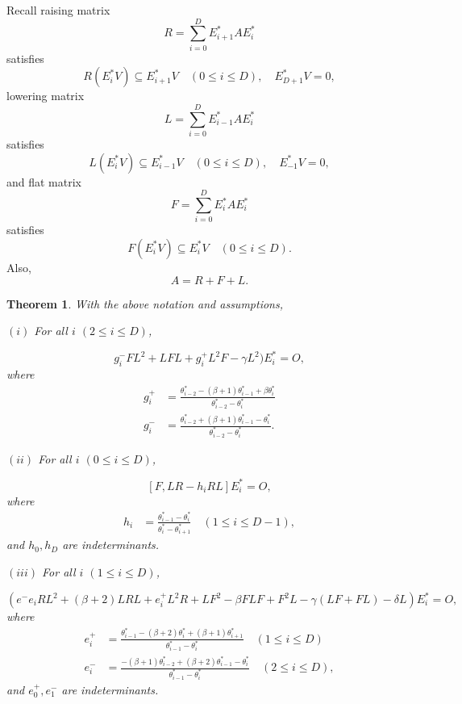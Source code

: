 \documentclass[
]{book}
\newtheorem{theorem}{Theorem}[chapter]
\theoremstyle{definition}
\theoremstyle{definition}
\theoremstyle{definition}
\theoremstyle{definition}
\theoremstyle{remark}
\begin{document}
Recall raising matrix
\[R = \sum_{i=0}^D E^*_{i+1}AE^*_i\]
satisfies
\[R(E^*_iV) \subseteq E^*_{i+1}V \quad (0\leq i\leq D), \quad E^*_{D+1}V = 0,\]
lowering matrix
\[L = \sum_{i=0}^D E^*_{i-1}AE^*_i\]
satisfies
\[L(E^*_iV) \subseteq E^*_{i-1}V \quad (0\leq i\leq D), \quad E^*_{-1}V = 0,\]
and flat matrix
\[F = \sum_{i=0}^D E^*_{i}AE^*_i\]
satisfies
\[F(E^*_iV) \subseteq E^*_{i}V \quad (0\leq i\leq D).\]
Also,
\[A = R + F + L.\]

\begin{theorem}
\protect\hypertarget{thm:rfl-relations}{}\label{thm:rfl-relations}With the above notation and assumptions,

\((i)\) For all \(i\) \((2\leq i\leq D)\),

\[g^-_iFL^2 + LFL + g^+_iL^2F - \gamma L^2)E^*_i = O,\]
where
\begin{align}
g^+_i & = \frac{\theta^*_{i-2}-(\beta+1)\theta^*_{i-1}+\beta\theta^*_i}{\theta^*_{i-2}-\theta^*_i}\\
g^-_i & = \frac{\theta^*_{i-2}+(\beta+1)\theta^*_{i-1}-\theta^*_i}{\theta^*_{i-2}-\theta^*_i}.
\end{align}

\((ii)\) For all \(i\) \((0\leq i\leq D)\),

\[[F, LR - h_iRL]E^*_i = O,\]
where
\begin{align}
h_i & = \frac{\theta^*_{i-1}-\theta^*_i}{\theta^*_i-\theta^*_{i+1}} \quad (1\leq i\leq D-1),
\end{align}
and \(h_0, h_D\) are indeterminants.

\((iii)\) For all \(i\) \((1\leq i\leq D)\),

\[(e^-e_iRL^2 + (\beta+2)LRL + e^+_iL^2R + LF^2 - \beta FLF + F^2L - \gamma(LF+FL) - \delta L)E^*_i = O,\]
where
\begin{align}
e^+_i & = \frac{\theta^*_{i-1}-(\beta+2)\theta^*_{i}+(\beta+1)\theta^*_{i+1}}{\theta^*_{i-1}-\theta^*_i} \quad (1\leq i\leq D)\\
e^-_i & = \frac{-(\beta+1)\theta^*_{i-2}+(\beta+2)\theta^*_{i-1}-\theta^*_i}{\theta^*_{i-1}-\theta^*_i} \quad (2\leq i\leq D),
\end{align}
and \(e^+_0, e^-_1\) are indeterminants.
\end{theorem}
\end{document}
